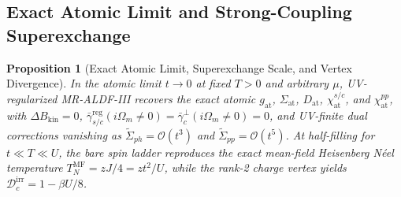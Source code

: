 \documentclass[11pt,a4paper]{article}
\numberwithin{equation}{section}
\theoremstyle{plain}
\newtheorem{proposition}{Proposition}[section]
\theoremstyle{definition}
\begin{document}
\subsection{Exact Atomic Limit and Strong-Coupling Superexchange}
\label{sec:atomic}

\begin{proposition}[Exact Atomic Limit, Superexchange Scale, and Vertex Divergence]
In the atomic limit $t \to 0$ at fixed $T > 0$ and arbitrary $\mu$, UV-regularized
MR-ALDF-III recovers the exact atomic $g_{\mathrm{at}}$, $\Sigma_{\mathrm{at}}$,
$D_{\mathrm{at}}$, $\chi_{\mathrm{at}}^{s/c}$, and $\chi_{\mathrm{at}}^{pp}$, with
$\Delta B_{\mathrm{kin}} = 0$,
$\bar{\gamma}_{s/c}^{\mathrm{reg}}(i\Omega_m \neq 0) = \bar{\gamma}_c^\perp(i\Omega_m \neq 0) = 0$,
and UV-finite dual corrections vanishing as $\tilde{\Sigma}_{ph} = \mathcal{O}(t^3)$
and $\tilde{\Sigma}_{pp} = \mathcal{O}(t^5)$. At half-filling for $t \ll T \ll U$, the
bare spin ladder reproduces the exact mean-field Heisenberg N\'eel temperature
$T_N^{\mathrm{MF}} = zJ/4 = zt^2/U$, while the rank-2 charge vertex yields
$\mathcal{D}_c^{\mathrm{irr}} = 1 - \beta U/8$.
\end{proposition}
\end{document}

